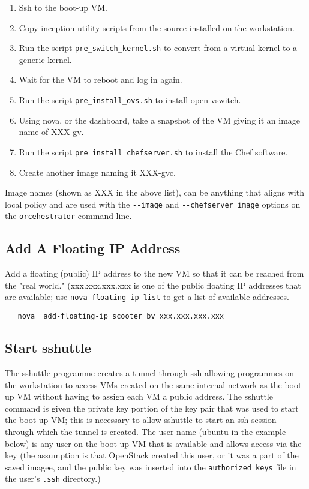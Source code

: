 \begin{enumerate}
	\item Ssh to the boot-up VM.
	\item Copy inception utility scripts from the source installed on the workstation.
	\item Run the script \verb!pre_switch_kernel.sh! to convert from a virtual kernel to a generic kernel.
	\item Wait for the VM to reboot and log in again.
	\item Run the script \verb!pre_install_ovs.sh! to install open vswitch.
	\item Using nova, or the dashboard, take a snapshot of the VM giving it an image name of XXX-gv.
	\item Run the script \verb!pre_install_chefserver.sh! to install the Chef software.
	\item Create another image naming it XXX-gvc.
\end{enumerate}

Image names (shown as XXX in the above list), can be anything that aligns with local policy and are used
with the \verb!--image! and \verb!--chefserver_image! options on the \verb!orcehestrator! command line.

\subsection{Add A Floating IP Address}
Add a floating (public) IP address to the new VM so that it can be reached from the "real world."
(xxx.xxx.xxx.xxx is one of the public floating IP addresses that are available; use \verb!nova floating-ip-list!
to get a list of available addresses.

\small\begin{verbatim}
   nova  add-floating-ip scooter_bv xxx.xxx.xxx.xxx
\end{verbatim}\normalsize

\subsection{Start sshuttle}
The sshuttle programme creates a tunnel through ssh allowing programmes on the workstation to access VMs created on the
same internal network as the boot-up VM without having to assign each VM a public address.
The sshuttle command is given the private key portion of the key pair that was used to start the boot-up VM; this is
necessary to allow sshuttle to start an ssh session through which the tunnel is created.
The user name (ubuntu in the example below) is any user on the boot-up VM that is available and allows access via
the key (the assumption is that OpenStack created this user, or it was a part of the saved imagee,  and the public key was
inserted into the \verb!authorized_keys! file in the user's \verb!.ssh! directory.)

